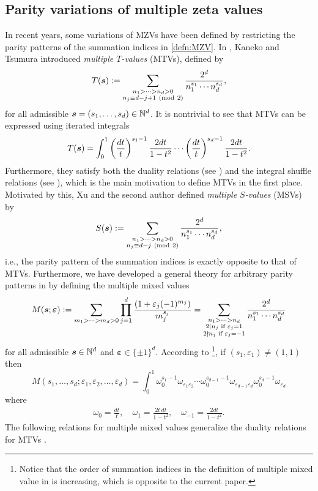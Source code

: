 \documentclass{article}
\newcommand\om{{\omega}}
\newcommand\eps{{\varepsilon}}
\newcommand{\bfs}{{\boldsymbol{\sl{s}}}}
\newcommand\bfeps{{\boldsymbol \varepsilon}}
\newcommand{\N}{\mathbb{N}}
\def\ppmod#1{{\ (\rm{mod}\ 2)}}
\theoremstyle{plain}
\theoremstyle{definition}
\begin{document}
\subsection{Parity variations of multiple zeta values}
In recent years, some variations of MZVs have been defined by restricting the parity patterns of the summation indices in \eqref{defn:MZV}.
In \cite{KanekoTs2020}, Kaneko and Tsumura introduced \emph{multiple $T$-values} (MTVs), defined by
\begin{align}\label{defn:MTV}
T(\bfs):= \sum_{\substack{n_1>\dots>n_d>0\\ n_j\equiv d-j+1\ppmod{2}}}  \frac{2^d}{n_1^{s_1}\cdots n_d^{s_d}},
\end{align}
for all admissible $\bfs=(s_1,\dots,s_d)\in\N^d$. It is nontrivial to see that MTVs can be expressed using iterated integrals
\begin{equation}\label{equ:MTVitIntegral}
T(\bfs)=\int_0^1  \left(\frac{dt}{t}\right)^{s_1-1}\frac{2dt}{1-t^2} \cdots \left(\frac{dt}{t}\right)^{s_d-1}\frac{2dt}{1-t^2}.
\end{equation}
Furthermore, they satisfy both the duality relations (see \cite[Thm. 3.1]{KanekoTs2020}) and the integral shuffle relations (see \cite[Thm. 2.1]{KanekoTs2020}), which is the main motivation to define MTVs in the first place.
Motivated by this, Xu and the second author \cite{XuZhao2020a} defined \emph{multiple $S$-values} (MSVs) by
\begin{align*}
S(\bfs):= \sum_{\substack{n_1>\dots>n_d>0\\ n_j\equiv d-j\ppmod{2}}} \frac{2^d}{n_1^{s_1}\cdots n_d^{s_d}},
\end{align*}
i.e., the parity pattern of the summation indices is exactly opposite to that of MTVs. Furthermore, we have developed  a general theory for arbitrary parity patterns in \cite{XuZhao2020a,XuZhao2020c} by defining the multiple mixed values
\begin{equation}\label{defn:MMV}
M(\bfs;\bfeps):=\sum_{m_1>\cdots>m_d>0} \prod_{j=1}^d \frac{(1+\eps_j(-1)^{m_j})}{m_j^{s_j}}
            =\sum_{\substack{n_1>\cdots>n_d\\ 2| n_j \text{ if } \eps_j=1 \\ 2\nmid n_j \text{ if } \eps_j=-1}}  \frac{2^d}{n_1^{s_1}\cdots n_d^{s_d}}
\end{equation}
for all admissible $\bfs\in\N^d$ and $\bfeps\in\{\pm 1\}^d$.
According to \cite[(2.1)]{XuZhao2020a}\footnote{Notice that the order of summation indices in the definition of multiple mixed value in \cite{XuZhao2020a} is increasing, which is opposite to the current paper.}, if $(s_1,\eps_1)\ne (1,1)$ then
\begin{equation*}
M(s_1,\dots,s_d;\eps_1,\eps_2,\dots,\eps_d)= \int_0^1 \om_0^{s_1-1}\om_{\eps_1\eps_2}\cdots\om_0^{s_{d-1}-1}\om_{\eps_{d-1}\eps_d}\om_0^{s_d-1}\om_{\eps_d}
\end{equation*}
where
\begin{align*}
 \om_0=\frac{dt}{t}, \quad \om_1=\frac{2t\, dt}{1-t^2}, \quad \om_{-1}=\frac{2dt}{1-t^2}.
\end{align*}
The following relations for multiple mixed values generalize the duality relations for MTVs \cite[Thm. 3.1]{KanekoTs2020}.
\end{document}
